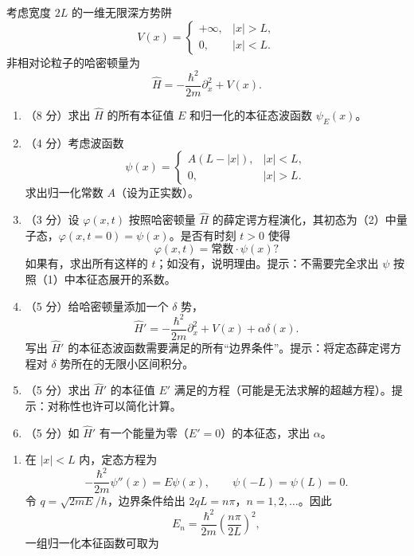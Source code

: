 
\begin{question}[共 30 分]
考虑宽度 $2L$ 的一维无限深方势阱
\[
V(x)=
\begin{cases}
+\infty, & |x|>L,\\
0, & |x|<L.
\end{cases}
\]
非相对论粒子的哈密顿量为
\[
\hat H=-\frac{\hbar^2}{2m}\partial_x^2+V(x).
\]
\begin{enumerate}
  \item （8 分）求出 $\hat H$ 的所有本征值 $E$ 和归一化的本征态波函数 $\psi_E(x)$。
  \item （4 分）考虑波函数
  \[
  \psi(x)=
  \begin{cases}
  A(L-|x|), & |x|<L,\\
  0, & |x|>L.
  \end{cases}
  \]
  求出归一化常数 $A$（设为正实数）。
  \item （3 分）设 $\varphi(x,t)$ 按照哈密顿量 $\hat H$ 的薛定谔方程演化，其初态为（2）中量子态，$\varphi(x,t=0)=\psi(x)$。是否有时刻 $t>0$ 使得
  \[
  \varphi(x,t)=\text{常数}\cdot \psi(x)?
  \]
  如果有，求出所有这样的 $t$；如没有，说明理由。提示：不需要完全求出 $\psi$ 按照（1）中本征态展开的系数。
  \item （5 分）给哈密顿量添加一个 $\delta$ 势，
  \[
  \hat H'=-\frac{\hbar^2}{2m}\partial_x^2+V(x)+\alpha\delta(x).
  \]
  写出 $\hat H'$ 的本征态波函数需要满足的所有“边界条件”。提示：将定态薛定谔方程对 $\delta$ 势所在的无限小区间积分。
  \item （5 分）求出 $\hat H'$ 的本征值 $E'$ 满足的方程（可能是无法求解的超越方程）。提示：对称性也许可以简化计算。
  \item （5 分）如 $\hat H'$ 有一个能量为零（$E'=0$）的本征态，求出 $\alpha$。
\end{enumerate}
\begin{solution}
\begin{enumerate}
  \item 在 $|x|<L$ 内，定态方程为
  \[
  -\frac{\hbar^2}{2m}\psi''(x)=E\psi(x),\qquad \psi(-L)=\psi(L)=0.
  \]
  令 $q=\sqrt{2mE}/\hbar$，边界条件给出 $2qL=n\pi$，$n=1,2,\dots$。因此
  \[
  E_n=\frac{\hbar^2}{2m}\left(\frac{n\pi}{2L}\right)^2,
  \]
  一组归一化本征函数可取为
\end{enumerate}
\end{solution}
\end{question}
